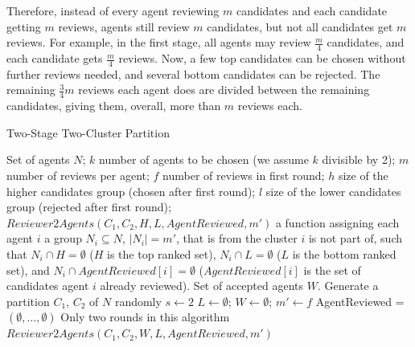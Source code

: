 \documentclass[letterpaper]{article} %
\begin{document}
Therefore, instead of every agent reviewing $m$ candidates and each candidate getting $m$ reviews, agents still review $m$ candidates, but not all candidates get $m$ reviews. For example, in the first stage, all agents may review $\frac{m}{4}$ candidates, and each candidate gets $\frac{m}{4}$ reviews. Now, a few top candidates can be chosen without further reviews needed, and several bottom candidates can be rejected. The remaining $\frac{3}{4}m$ reviews each agent does are divided between the remaining candidates, giving them, overall, more than $m$ reviews each.

\begin{algorithm}[t]
\small
\caption{Two-Stage Two-Cluster Partition}\label{2StagePartition}
\begin{algorithmic}[1]
\Require
Set of agents $N$; %
\newline
$k$ number of agents to be chosen (we assume $k$ divisible by 2);
\newline
$m$ number of reviews per agent;
\newline
$f$ number of reviews in first round;
\newline
$h$ size of the higher candidates group (chosen after first round);
\newline
$l$ size of the lower candidates group (rejected after first round);
\newline
$Reviewer2Agents(C_{1},C_{2},H,L,AgentReviewed,m')$ a function assigning each agent $i$ a group $N_{i}\subseteq N$, $|N_{i}|=m'$, that is from the cluster $i$ is not part of, such that $N_{i}\cap H=\emptyset$ ($H$ is the top ranked set), $N_{i}\cap L=\emptyset$ ($L$ is the bottom ranked set), and $N_{i}\cap AgentReviewed[i]=\emptyset$ ($AgentReviewed[i]$ is the set of candidates agent $i$ already reviewed).
\newline
\Ensure Set of accepted agents $W$.
\State Generate a partition {$C_{1}$, $C_{2}$} of $N$ randomly
\State $s \gets 2$ 
\State $L \gets \emptyset$; 
\State $W \gets \emptyset$; 
\State $m' \gets f$ 
\State AgentReviewed = $(\emptyset , \ldots , \emptyset)$
 \Comment Only two rounds in this algorithm
 \State $Reviewer2Agents(C_{1},C_{2},W,L,AgentReviewed,m')$


\end{algorithmic}
\end{algorithm}
\end{document}
